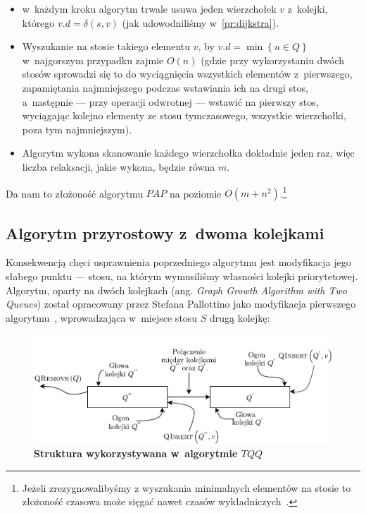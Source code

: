 \begin{itemize}
\item w~każdym kroku algorytm trwale usuwa jeden wierzchołek $v$ z~kolejki, którego $v.d = \delta \left( s, v \right)$ (jak udowodniliśmy w~\ref{pr:dijkstra}).
\item Wyszukanie na stosie takiego elementu $v$, by $v.d = \min \left\{ u \in Q \right\}$ w~najgorszym przypadku zajmie $ O \left( n \right) $ (gdzie przy wykorzystaniu dwóch stosów sprowadzi się to do wyciągnięcia wszystkich elementów z~pierwszego, zapamiętania najmniejszego podczas wstawiania ich na drugi stos, a~następnie --- przy operacji odwrotnej --- wstawić na pierwszy stos, wyciągając kolejno elementy ze stosu tymczasowego, wszystkie wierzchołki, poza tym najmniejszym).
\item Algorytm wykona skanowanie każdego wierzchołka dokładnie jeden raz, więc liczba relaksacji, jakie wykona, będzie równa $m$.
\end{itemize}

Da nam to złożoność algorytmu $PAP$ na poziomie $ O \left( m + n^{2} \right)$.\footnote{Jeżeli zrezygnowalibyśmy z wyszukania minimalnych elementów na stosie to złożoność czasowa może sięgać nawet czasów wykładniczych~\cite[$4$]{GIDA}.}

\subsection{Algorytm przyrostowy z~dwoma kolejkami}

Konsekwencją chęci usprawnienia poprzedniego algorytmu jest modyfikacja jego słabego punktu --- stosu, na którym wymusiliśmy własności kolejki priorytetowej. Algorytm, oparty na dwóch kolejkach (ang. \textit{Graph Growth Algorithm with Two Queues}) został opracowany przez Stefana Pallottino jako modyfikacja pierwszego algorytmu~\cite[$4.$]{GIDA}, wprowadzająca w~miejsce stosu $S$ drugą kolejkę:

\begin{figure}[!htbp]
	\centering
	\includegraphics[width=\textwidth]{Chapter_III/GRAPH-GROWTH-2Q-Other/a.pdf}
	\caption{\textbf{Struktura wykorzystywana w~algorytmie $TQQ$} } \label{fig:exampleTQQStructure}
\end{figure}

